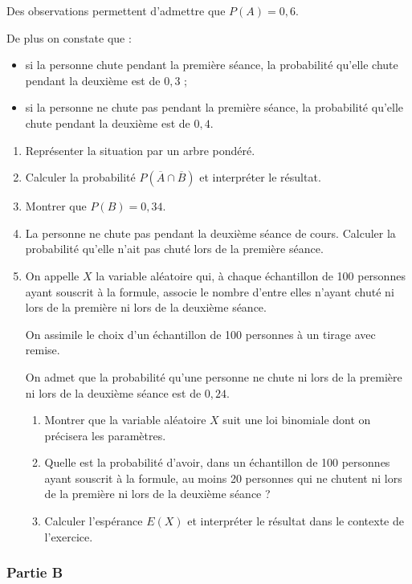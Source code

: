 \documentclass[11pt,a4paper]{article}
\begin{document}
Des observations permettent d'admettre que $P(A)=0{,}6$.

De plus on constate que :
\begin{itemize}
  \item si la personne chute pendant la première séance, la probabilité qu'elle chute pendant la deuxième est de $0{,}3$ ;
  \item si la personne ne chute pas pendant la première séance, la probabilité qu'elle chute pendant la deuxième est de $0{,}4$.
\end{itemize}

\begin{enumerate}
  \item Représenter la situation par un arbre pondéré.
\item Calculer la probabilité $P(\overline A\cap \overline B)$ et interpréter le résultat.
\item Montrer que $P(B)=0{,}34$.
\item La personne ne chute pas pendant la deuxième séance de cours. Calculer la probabilité qu'elle n'ait pas chuté lors de la première séance.
\item On appelle $X$ la variable aléatoire qui, à chaque échantillon de 100 personnes ayant souscrit à la formule, associe le nombre d'entre elles n'ayant chuté ni lors de la première ni lors de la deuxième séance.

  On assimile le choix d'un échantillon de 100 personnes à un tirage avec remise.

  On admet que la probabilité qu'une personne ne chute ni lors de la première ni lors de la deuxième séance est de $0{,}24$.
  \begin{enumerate}
    \item Montrer que la variable aléatoire $X$ suit une loi binomiale dont on précisera les paramètres.
    \item Quelle est la probabilité d'avoir, dans un échantillon de 100 personnes ayant souscrit à la formule, au moins 20 personnes qui ne chutent ni lors de la première ni lors de la deuxième séance ?
    \item Calculer l'espérance $E(X)$ et interpréter le résultat dans le contexte de l'exercice.
  \end{enumerate}
\end{enumerate}

\subsubsection*{Partie B}
\end{document}
